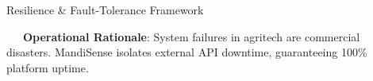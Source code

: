 \documentclass{beamer}
\begin{document}
\begin{frame}{Resilience \& Fault-Tolerance Framework}
\vspace{0.15cm}
\begin{tcolorbox}[enhanced, colback=primaryblue!4, colframe=primaryblue!30, boxrule=0.35pt,
  arc=3.5pt, width=0.98\textwidth, left=4pt, right=4pt, top=2.5pt, bottom=2.5pt, boxsep=0pt,
  halign=center, shadow={0.5pt}{-0.5pt}{0pt}{black!8}]
    \fontsize{5.5pt}{6.5pt}\selectfont
    \textcolor{primaryDark}{~~~\textbf{Operational Rationale}: System failures in agritech are commercial disasters. MandiSense isolates external API downtime, guaranteeing 100\% platform uptime.}
\end{tcolorbox}
\end{frame}

\end{document}
